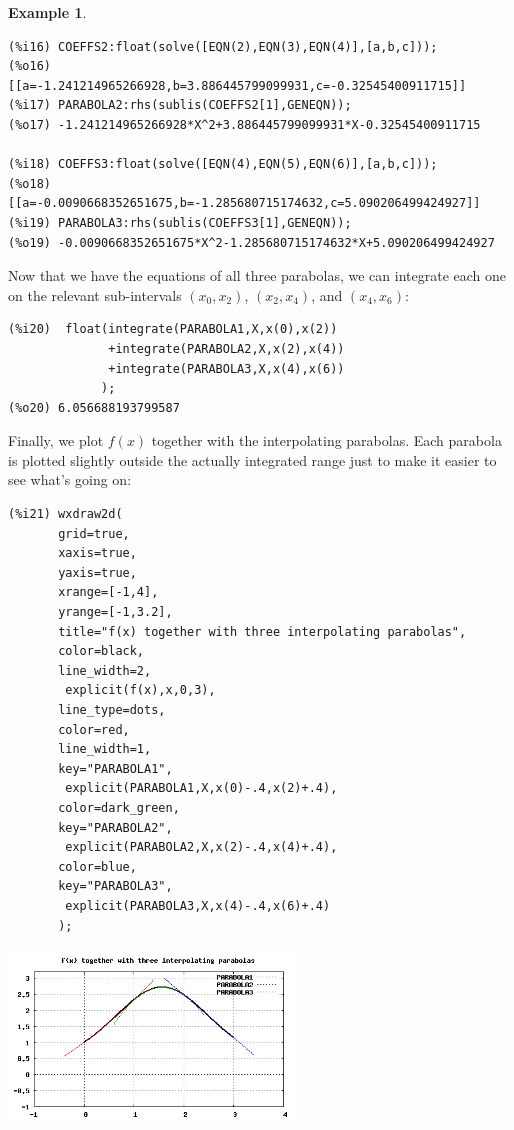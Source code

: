 \documentclass[10.5pt,twoside]{report}
\theoremstyle{definition}
\newtheorem{exmp}{Example}[section]
\begin{document}
\begin{exmp}
\begin{verbatim}
(%i16) COEFFS2:float(solve([EQN(2),EQN(3),EQN(4)],[a,b,c]));
(%o16) [[a=-1.241214965266928,b=3.886445799099931,c=-0.32545400911715]]
(%i17) PARABOLA2:rhs(sublis(COEFFS2[1],GENEQN));
(%o17) -1.241214965266928*X^2+3.886445799099931*X-0.32545400911715

(%i18) COEFFS3:float(solve([EQN(4),EQN(5),EQN(6)],[a,b,c]));
(%o18) [[a=-0.0090668352651675,b=-1.285680715174632,c=5.090206499424927]]
(%i19) PARABOLA3:rhs(sublis(COEFFS3[1],GENEQN));
(%o19) -0.0090668352651675*X^2-1.285680715174632*X+5.090206499424927
\end{verbatim}

Now that we have the equations of all three parabolas, we can integrate each one on the relevant sub-intervals $(x_0,x_2)$, $(x_2,x_4)$, and $(x_4,x_6)$:

\begin{verbatim}
(%i20)  float(integrate(PARABOLA1,X,x(0),x(2))
              +integrate(PARABOLA2,X,x(2),x(4))
              +integrate(PARABOLA3,X,x(4),x(6))
             );
(%o20) 6.056688193799587
\end{verbatim}

Finally, we plot $f(x)$ together with the interpolating parabolas.  Each parabola is plotted slightly outside the actually integrated range just to make it easier to see what's going on:

\begin{verbatim}
(%i21) wxdraw2d(
       grid=true,
       xaxis=true,
       yaxis=true,
       xrange=[-1,4],
       yrange=[-1,3.2],
       title="f(x) together with three interpolating parabolas",
       color=black,
       line_width=2,
        explicit(f(x),x,0,3),
       line_type=dots,
       color=red,
       line_width=1,
       key="PARABOLA1",
        explicit(PARABOLA1,X,x(0)-.4,x(2)+.4),
       color=dark_green,
       key="PARABOLA2",
        explicit(PARABOLA2,X,x(2)-.4,x(4)+.4),
       color=blue,
       key="PARABOLA3",
        explicit(PARABOLA3,X,x(4)-.4,x(6)+.4)
       );
\end{verbatim}


\includegraphics[width=3in]{example_2_3_2_1}

\end{exmp}
\end{document}
